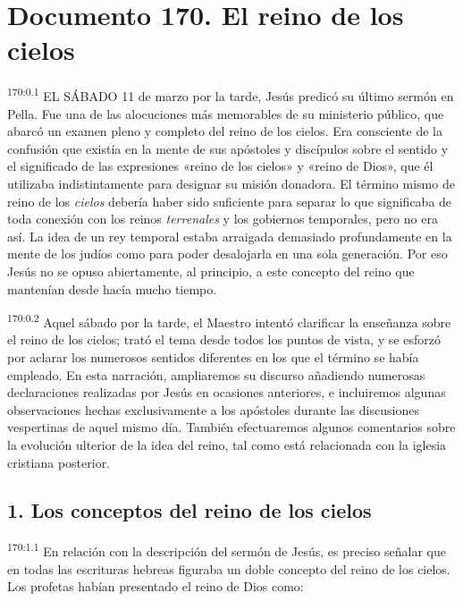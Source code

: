 \chapter{Documento 170. El reino de los cielos}
\par 
\textsuperscript{170:0.1} EL SÁBADO 11 de marzo por la tarde, Jesús predicó su último sermón en Pella. Fue una de las alocuciones más memorables de su ministerio público, que abarcó un examen pleno y completo del reino de los cielos. Era consciente de la confusión que existía en la mente de sus apóstoles y discípulos sobre el sentido y el significado de las expresiones «reino de los cielos» y «reino de Dios», que él utilizaba indistintamente para designar su misión donadora. El término mismo de reino de los \textit{cielos} debería haber sido suficiente para separar lo que significaba de toda conexión con los reinos \textit{terrenales} y los gobiernos temporales, pero no era así. La idea de un rey temporal estaba arraigada demasiado profundamente en la mente de los judíos como para poder desalojarla en una sola generación. Por eso Jesús no se opuso abiertamente, al principio, a este concepto del reino que mantenían desde hacía mucho tiempo.

\par 
\textsuperscript{170:0.2} Aquel sábado por la tarde, el Maestro intentó clarificar la enseñanza sobre el reino de los cielos; trató el tema desde todos los puntos de vista, y se esforzó por aclarar los numerosos sentidos diferentes en los que el término se había empleado. En esta narración, ampliaremos su discurso añadiendo numerosas declaraciones realizadas por Jesús en ocasiones anteriores, e incluiremos algunas observaciones hechas exclusivamente a los apóstoles durante las discusiones vespertinas de aquel mismo día. También efectuaremos algunos comentarios sobre la evolución ulterior de la idea del reino, tal como está relacionada con la iglesia cristiana posterior.

\section*{1. Los conceptos del reino de los cielos}
\par 
\textsuperscript{170:1.1} En relación con la descripción del sermón de Jesús, es preciso señalar que en todas las escrituras hebreas figuraba un doble concepto del reino de los cielos. Los profetas habían presentado el reino de Dios como:

